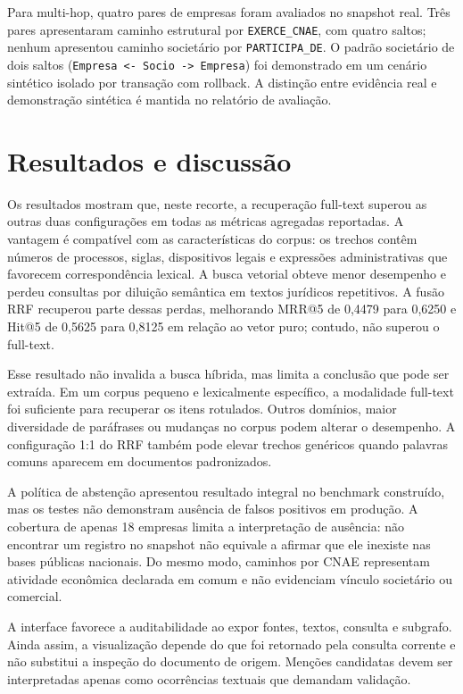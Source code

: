 \documentclass[12pt]{article}
\begin{document}
Para multi-hop, quatro pares de empresas foram avaliados no snapshot real. Três pares apresentaram caminho estrutural por \texttt{EXERCE\_CNAE}, com quatro saltos; nenhum apresentou caminho societário por \texttt{PARTICIPA\_DE}. O padrão societário de dois saltos (\texttt{Empresa <- Socio -> Empresa}) foi demonstrado em um cenário sintético isolado por transação com rollback. A distinção entre evidência real e demonstração sintética é mantida no relatório de avaliação.

\section{Resultados e discussão}

Os resultados mostram que, neste recorte, a recuperação full-text superou as outras duas configurações em todas as métricas agregadas reportadas. A vantagem é compatível com as características do corpus: os trechos contêm números de processos, siglas, dispositivos legais e expressões administrativas que favorecem correspondência lexical. A busca vetorial obteve menor desempenho e perdeu consultas por diluição semântica em textos jurídicos repetitivos. A fusão RRF recuperou parte dessas perdas, melhorando MRR@5 de 0,4479 para 0,6250 e Hit@5 de 0,5625 para 0,8125 em relação ao vetor puro; contudo, não superou o full-text.

Esse resultado não invalida a busca híbrida, mas limita a conclusão que pode ser extraída. Em um corpus pequeno e lexicalmente específico, a modalidade full-text foi suficiente para recuperar os itens rotulados. Outros domínios, maior diversidade de paráfrases ou mudanças no corpus podem alterar o desempenho. A configuração 1:1 do RRF também pode elevar trechos genéricos quando palavras comuns aparecem em documentos padronizados.

A política de abstenção apresentou resultado integral no benchmark construído, mas os testes não demonstram ausência de falsos positivos em produção. A cobertura de apenas 18 empresas limita a interpretação de ausência: não encontrar um registro no snapshot não equivale a afirmar que ele inexiste nas bases públicas nacionais. Do mesmo modo, caminhos por CNAE representam atividade econômica declarada em comum e não evidenciam vínculo societário ou comercial.

A interface favorece a auditabilidade ao expor fontes, textos, consulta e subgrafo. Ainda assim, a visualização depende do que foi retornado pela consulta corrente e não substitui a inspeção do documento de origem. Menções candidatas devem ser interpretadas apenas como ocorrências textuais que demandam validação.
\end{document}

